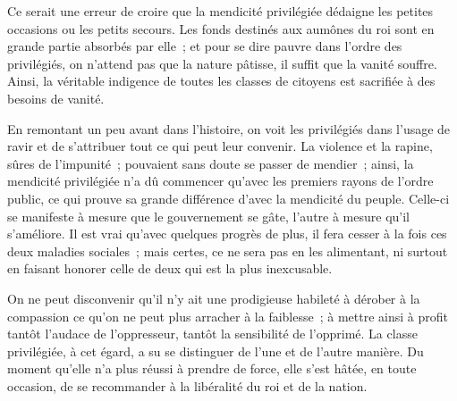 \documentclass[french,twoside]{book} %
\begin{document}
Ce serait une erreur de croire que la mendicité privilégiée dédaigne les petites occasions ou les petits secours. Les fonds destinés aux aumônes du roi sont en grande partie absorbés par elle ; et pour se dire pauvre dans l’ordre des privilégiés, on n’attend pas que la nature pâtisse, il suffit que la vanité souffre. Ainsi, la véritable indigence de toutes les classes de citoyens est sacrifiée à des besoins de vanité.\par
En remontant un peu avant dans l’histoire, on voit les privilégiés dans l’usage de ravir et de s’attribuer tout ce qui peut leur convenir. La violence et la rapine, sûres de l’impunité ; pouvaient sans doute se passer de mendier ; ainsi, la mendicité privilégiée n’a dû commencer qu’avec les premiers rayons de l’ordre public, ce qui prouve sa grande différence d’avec la mendicité du peuple. Celle-ci se manifeste à mesure que le gouvernement se gâte, l’autre à mesure qu’il s’améliore. Il est vrai qu’avec quelques progrès de plus, il fera cesser à la fois ces deux maladies sociales ; mais certes, ce ne sera pas en les alimentant, ni surtout en faisant honorer celle de deux qui est la plus inexcusable.\par
On ne peut disconvenir qu’il n’y ait une prodigieuse habileté à dérober à la compassion ce qu’on ne peut plus arracher à la faiblesse ; à mettre ainsi à profit tantôt l’audace de l’oppresseur, tantôt la sensibilité de l’opprimé. La classe privilégiée, à cet égard, a su se distinguer de l’une et de l’autre manière. Du moment qu’elle n’a plus réussi à prendre de force, elle s’est hâtée, en toute occasion, de se recommander à la libéralité du roi et de la nation.\par
\end{document}
